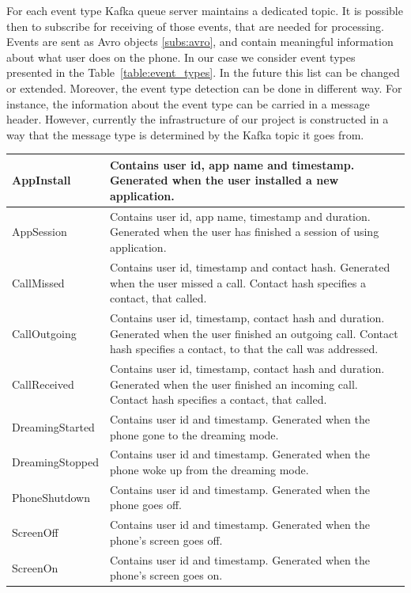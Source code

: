 For each event type Kafka queue server maintains a dedicated topic.
It is possible then to subscribe for receiving of those events, that are needed for processing.
Events are sent as Avro objects \ref{subs:avro}, and contain meaningful information about what user does on the phone.
In our case we consider event types presented in the Table~\ref{table:event_types}.
In the future this list can be changed or extended.
Moreover, the event type detection can be done in different way.
For instance, the information about the event type can be carried in a message header.
However, currently the infrastructure of our project is constructed in a way that the message type is determined by the Kafka topic it goes from.

\begin{table}[h]
\begin{tabular}{ | l | p{10cm} |}
    \hline
    AppInstall & Contains user id, app name and timestamp. Generated when the user installed a new application. \\ \hline
    AppSession & Contains user id, app name, timestamp and duration. Generated when the user has finished a session of using application. \\ \hline
    CallMissed & Contains user id, timestamp and contact hash. Generated when the user missed a call. Contact hash specifies a contact, that called. \\ \hline
    CallOutgoing & Contains user id, timestamp, contact hash and duration. Generated when the user finished an outgoing call. Contact hash specifies a contact, to that the call was addressed. \\ \hline
    CallReceived & Contains user id, timestamp, contact hash and duration. Generated when the user finished an incoming call. Contact hash specifies a contact, that called. \\ \hline
    DreamingStarted & Contains user id and timestamp. Generated when the phone gone to the dreaming mode. \\ \hline
    DreamingStopped & Contains user id and timestamp. Generated when the phone woke up from the dreaming mode. \\ \hline
    PhoneShutdown & Contains user id and timestamp. Generated when the phone goes off. \\ \hline
    ScreenOff & Contains user id and timestamp. Generated when the phone's screen goes off. \\ \hline
    ScreenOn & Contains user id and timestamp. Generated when the phone's screen goes on. \\ \hline

\end{tabular}
\end{table}
